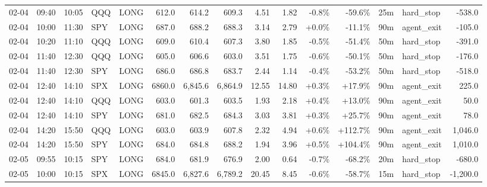 \documentclass[11pt,a4paper,twoside]{article}
\begin{document}
\begin{landscape}
\begin{center}
\begin{longtable}{>{\color{txtmain}}l l l l l r r r r r r r r >{\color{txtmain}}l r}
02-04 & 09:40 & 10:05 & QQQ & LONG & 612.0 & 614.2 & 609.3 & 4.51 & 1.82 & \textcolor{lossred}{-0.8\%} & \textcolor{lossred}{-59.6\%} & 25m & hard\_stop & \textcolor{lossred}{-538.0} \\
02-04 & 10:00 & 11:30 & SPY & LONG & 687.0 & 688.2 & 688.3 & 3.14 & 2.79 & \textcolor{wingreen}{+0.0\%} & \textcolor{lossred}{-11.1\%} & 90m & agent\_exit & \textcolor{lossred}{-105.0} \\
02-04 & 10:20 & 11:10 & QQQ & LONG & 609.0 & 610.4 & 607.3 & 3.80 & 1.85 & \textcolor{lossred}{-0.5\%} & \textcolor{lossred}{-51.4\%} & 50m & hard\_stop & \textcolor{lossred}{-391.0} \\
02-04 & 11:40 & 12:30 & QQQ & LONG & 605.0 & 606.6 & 603.0 & 3.51 & 1.75 & \textcolor{lossred}{-0.6\%} & \textcolor{lossred}{-50.1\%} & 50m & hard\_stop & \textcolor{lossred}{-176.0} \\
02-04 & 11:40 & 12:30 & SPY & LONG & 686.0 & 686.8 & 683.7 & 2.44 & 1.14 & \textcolor{lossred}{-0.4\%} & \textcolor{lossred}{-53.2\%} & 50m & hard\_stop & \textcolor{lossred}{-518.0} \\
02-04 & 12:40 & 14:10 & SPX & LONG & 6860.0 & 6,845.6 & 6,864.9 & 12.55 & 14.80 & \textcolor{wingreen}{+0.3\%} & \textcolor{wingreen}{+17.9\%} & 90m & agent\_exit & \textcolor{wingreen}{225.0} \\
02-04 & 12:40 & 14:10 & QQQ & LONG & 603.0 & 601.3 & 603.5 & 1.93 & 2.18 & \textcolor{wingreen}{+0.4\%} & \textcolor{wingreen}{+13.0\%} & 90m & agent\_exit & \textcolor{wingreen}{50.0} \\
02-04 & 12:40 & 14:10 & SPY & LONG & 681.0 & 682.5 & 684.3 & 3.03 & 3.81 & \textcolor{wingreen}{+0.3\%} & \textcolor{wingreen}{+25.7\%} & 90m & agent\_exit & \textcolor{wingreen}{78.0} \\
02-04 & 14:20 & 15:50 & QQQ & LONG & 603.0 & 603.9 & 607.8 & 2.32 & 4.94 & \textcolor{wingreen}{+0.6\%} & \textcolor{wingreen}{+112.7\%} & 90m & agent\_exit & \textcolor{wingreen}{1,046.0} \\
02-04 & 14:20 & 15:50 & SPY & LONG & 684.0 & 684.8 & 688.2 & 1.94 & 3.96 & \textcolor{wingreen}{+0.5\%} & \textcolor{wingreen}{+104.4\%} & 90m & agent\_exit & \textcolor{wingreen}{1,010.0} \\
02-05 & 09:55 & 10:15 & SPY & LONG & 684.0 & 681.9 & 676.9 & 2.00 & 0.64 & \textcolor{lossred}{-0.7\%} & \textcolor{lossred}{-68.2\%} & 20m & hard\_stop & \textcolor{lossred}{-680.0} \\
02-05 & 10:00 & 10:15 & SPX & LONG & 6845.0 & 6,827.6 & 6,789.2 & 20.45 & 8.45 & \textcolor{lossred}{-0.6\%} & \textcolor{lossred}{-58.7\%} & 15m & hard\_stop & \textcolor{lossred}{-1,200.0} \\

\end{longtable}
\end{center}
\end{landscape}
\end{document}
